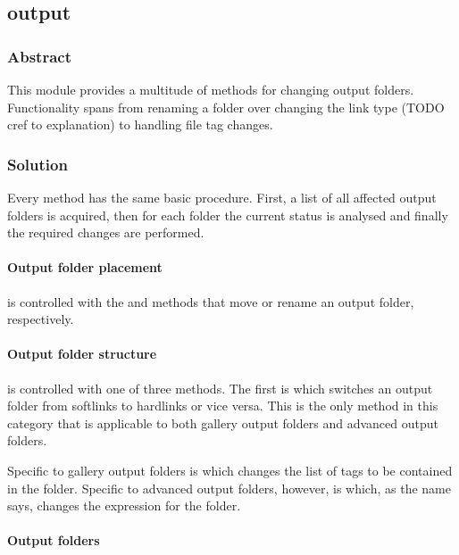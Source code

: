 \subsection{output}
\def\kapitelautor{Clemens Stadlbauer}

\subsubsection{Abstract}

This module provides a multitude of methods for changing output folders.
Functionality spans from renaming a folder over changing the link type (TODO
cref to explanation) to handling file tag changes.

\subsubsection{Solution} %

Every method has the same basic procedure. First, a list of all affected output
folders is acquired, then for each folder the current status is analysed and
finally the required changes are performed.


\paragraph{Output folder placement}

is controlled with the  and  methods that move or
rename an output folder, respectively.

\paragraph{Output folder structure} %

is controlled with one of three methods. The first is 
which switches an output folder from softlinks to hardlinks or vice versa. This
is the only method in this category that is applicable to both gallery output
folders and advanced output folders.

Specific to gallery output folders is  which changes
the list of tags to be contained in the folder. Specific to advanced output
folders, however, is  which, as the name says,
changes the expression for the folder.

\paragraph{Output folders}

